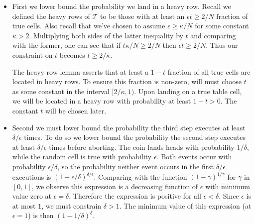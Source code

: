 \begin{itemize}
    \item
    First we lower bound the probability we land in a heavy row.
    Recall we  defined the heavy rows of $\mathcal{T}$ to be those with at least an $\epsilon t \geq 2/N$ fraction of true cells.
    Also recall that we've chosen to assume $\epsilon \geq \kappa/N$ for some constant $\kappa > 2$.
    Multiplying both sides of the latter inequality by $t$ and comparing with the former, one can see that if $t\kappa/N \geq 2/N$ then $\epsilon t \geq 2/N$.
    Thus our constraint on $t$ becomes $t \geq 2/\kappa$.

    The heavy row lemma asserts that at least a $1-t$ fraction of all true cells are located in heavy rows.
    To ensure this fraction is non-zero, will must choose $t$ as some constant in the interval $[2/\kappa,1)$.
    Upon landing on a true table cell, we will be located in a heavy row with probability at least $1-t > 0$.
    The constant $t$ will be chosen later.

    \item
    Second we must lower bound the probability the third step executes at least $\delta/\epsilon$ times.
    To do so we lower bound the probability the second step executes at least $\delta/\epsilon$ times before aborting.
    The coin lands heads with probability $1/\delta$, while the random cell is true with probability $\epsilon$.
    Both events occur with probability $\epsilon/\delta$, so the probability neither event occurs in the first $\delta/\epsilon$ executions is $(1-\epsilon/\delta)^{\delta/\epsilon}$.
    Comparing with the function $(1-\gamma)^{1/\gamma}$ for $\gamma$ in $[0,1]$, we observe this expression is a decreasing function of $\epsilon$ with minimum value zero at $\epsilon = \delta$.
    Therefore the expression is positive for all $\epsilon < \delta$.
    Since $\epsilon$ is at most $1$, we must constrain $\delta > 1$.
    The minimum value of this expression (at $\epsilon = 1$) is then $(1-1/\delta)^\delta$.


\end{itemize}

